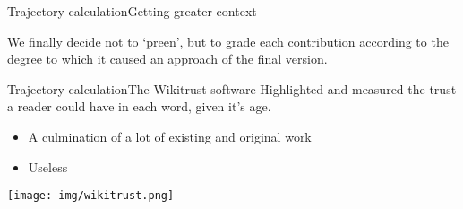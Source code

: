 \documentclass[t]{beamer}
\begin{document}
    \begin{frame}[fragile]{Trajectory calculation}{Getting greater context}

      We finally decide not to `preen', but to grade each contribution
      according to the degree to which it caused an approach of the
      final version.   
    
    \begin{figure}
    \end{figure}
\end{frame}

 \begin{frame}{Trajectory calculation}{The Wikitrust software}
   Highlighted and measured the trust a reader could have in each
   word, given it's age.\cite{Adler2007}

   \begin{itemize}
   \item <1-> A culmination of a lot of existing and original work
   \item <2-> Useless \cite{Lucassen2011}
   \end{itemize}
   
   \texttt{[image: img/wikitrust.png]}

 \end{frame}
\end{document}

